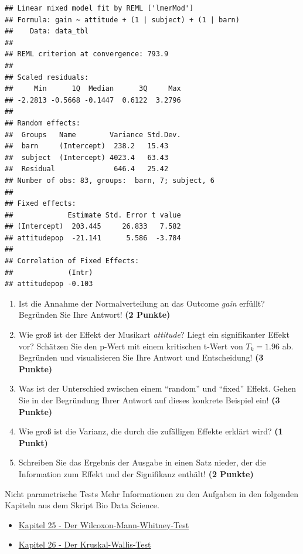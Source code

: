 \documentclass[a4paper, 10pt]{scrartcl}\usepackage[]{graphicx}\usepackage[]{xcolor}
\makeatletter
\newenvironment{kframe}{%
 \def\at@end@of@kframe{}%
 \ifinner\ifhmode%
  \def\at@end@of@kframe{\end{minipage}}%
  \begin{minipage}{\columnwidth}%
 \fi\fi%
 \def\FrameCommand##1{\hskip\@totalleftmargin \hskip-\fboxsep
 \colorbox{shadecolor}{##1}\hskip-\fboxsep
     \hskip-\linewidth \hskip-\@totalleftmargin \hskip\columnwidth}%
 \MakeFramed {\advance\hsize-\width
   \@totalleftmargin\z@ \linewidth\hsize
   \@setminipage}}%
 {\par\unskip\endMakeFramed%
 \at@end@of@kframe}
\newenvironment{knitrout}{}{} %
\makeatother
\begin{document}
\begin{knitrout}
\color{fgcolor}\begin{kframe}
\begin{verbatim}
## Linear mixed model fit by REML ['lmerMod']
## Formula: gain ~ attitude + (1 | subject) + (1 | barn)
##    Data: data_tbl
## 
## REML criterion at convergence: 793.9
## 
## Scaled residuals: 
##     Min      1Q  Median      3Q     Max 
## -2.2813 -0.5668 -0.1447  0.6122  3.2796 
## 
## Random effects:
##  Groups   Name        Variance Std.Dev.
##  barn     (Intercept)  238.2   15.43   
##  subject  (Intercept) 4023.4   63.43   
##  Residual              646.4   25.42   
## Number of obs: 83, groups:  barn, 7; subject, 6
## 
## Fixed effects:
##             Estimate Std. Error t value
## (Intercept)  203.445     26.833   7.582
## attitudepop  -21.141      5.586  -3.784
## 
## Correlation of Fixed Effects:
##             (Intr)
## attitudepop -0.103
\end{verbatim}
\end{kframe}
\end{knitrout}


\begin{enumerate}
\item Ist die Annahme der Normalverteilung an das Outcome \textit{gain} erf{\"u}llt?
  Begr{\"u}nden Sie Ihre Antwort! \textbf{(2 Punkte)}
\item Wie gro{\ss} ist der Effekt der Musikart \textit{attitude}? Liegt ein signifikanter
  Effekt vor? Sch{\"a}tzen Sie den p-Wert mit einem kritischen t-Wert von $T_k
  = 1.96$ ab. Begr{\"u}nden und visualisieren Sie Ihre Antwort und
  Entscheidung! \textbf{(3 Punkte)}
\item Was ist der Unterschied zwischen einem "`random"' und "`fixed"'
  Effekt. Gehen Sie in der Begr{\"u}ndung Ihrer Antwort auf dieses konkrete
  Beispiel ein! \textbf{(3 Punkte)}
\item Wie gro{\ss} ist die Varianz, die durch die zuf{\"a}lligen Effekte erkl{\"a}rt wird? \textbf{(1 Punkt)}
\item Schreiben Sie das Ergebnis der \Rlogo Ausgabe in einen Satz nieder, der die
  Information zum Effekt und der Signifikanz enth{\"a}lt! \textbf{(2 Punkte)}
\end{enumerate}
 
\clearpage
\begin{graybox}{Nicht parametrische Tests}
Mehr Informationen zu den Aufgaben in den folgenden Kapiteln aus dem Skript Bio Data Science.
  \begin{itemize}
  \item \href{https://jkruppa.github.io/stat-tests-utest.html}{Kapitel 25 - Der Wilcoxon-Mann-Whitney-Test}
  \item \href{https://jkruppa.github.io/stat-tests-kruskal.html}{Kapitel 26 - Der Kruskal-Wallis-Test}
  \end{itemize}
\end{graybox}
\clearpage
\end{document}
